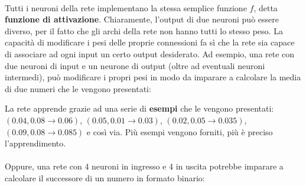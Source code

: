 \documentclass[12pt]{article}
\begin{document}
\paragraph{}
Tutti i neuroni della rete implementano la stessa semplice funzione $f$, detta \textbf{funzione di attivazione}. Chiaramente, l'output di due neuroni può essere diverso, per il fatto che gli archi della rete non hanno tutti lo stesso peso. La capacità di modificare i pesi delle proprie connessioni fa sì che la rete sia capace di associare ad ogni input un certo output desiderato. Ad esempio, una rete con due neuroni di input e un neurone di output (oltre ad eventuali neuroni intermedi), può modificare i propri pesi in modo da imparare a calcolare la media di due numeri che le vengono presentati:

\begin{center}
\end{center}

La rete apprende grazie ad una serie di \textbf{esempi} che le vengono presentati: $(0.04, 0.08 \rightarrow 0.06)$, $(0.05, 0.01 \rightarrow 0.03)$, $(0.02, 0.05 \rightarrow 0.035)$, $(0.09, 0.08 \rightarrow 0.085)$ e così via. Più esempi vengono forniti, più è preciso l'apprendimento.

\paragraph{}
Oppure, una rete con 4 neuroni in ingresso e 4 in uscita potrebbe imparare a calcolare il successore di un numero in formato binario:
\end{document}

